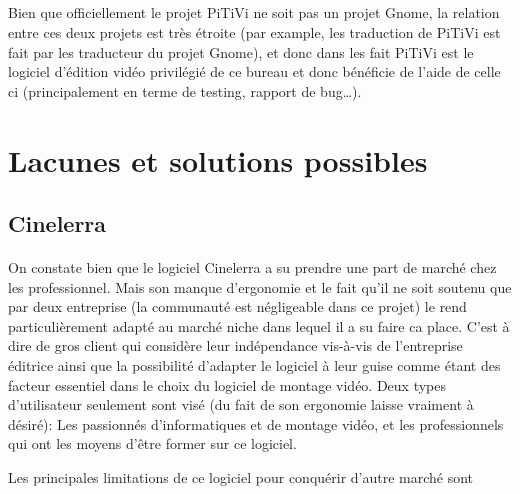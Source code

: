 \subparagraph{}

Bien que officiellement le projet PiTiVi ne soit pas un projet Gnome,
la relation entre ces deux projets est très étroite (par example, les
traduction de PiTiVi est fait par les traducteur du projet Gnome), et
donc dans les fait PiTiVi est le logiciel d'édition vidéo privilégié de
ce bureau et donc bénéficie de l'aide de celle ci (principalement en terme
de testing, rapport de bug\ldots).

\newpage \section{Lacunes et solutions possibles}

\subsection {Cinelerra}

\paragraph{} On constate bien que le logiciel Cinelerra a su prendre une
part de marché chez les professionnel. Mais son manque d'ergonomie et
le fait qu'il ne soit soutenu que par deux entreprise (la communauté
est négligeable dans ce projet) le rend particulièrement adapté au
marché niche dans lequel il a su faire ca place. C'est à dire de gros
client qui considère leur indépendance vis-à-vis de l'entreprise
éditrice ainsi que la possibilité d'adapter le logiciel à leur guise
comme étant des facteur essentiel dans le choix du logiciel de montage
vidéo. Deux types d'utilisateur  seulement sont visé (du fait de son
ergonomie laisse vraiment à désiré): Les passionnés d'informatiques
et de montage vidéo, et les professionnels qui ont les moyens d'être
former sur ce logiciel.

Les principales limitations de ce logiciel pour conquérir d'autre
marché sont

